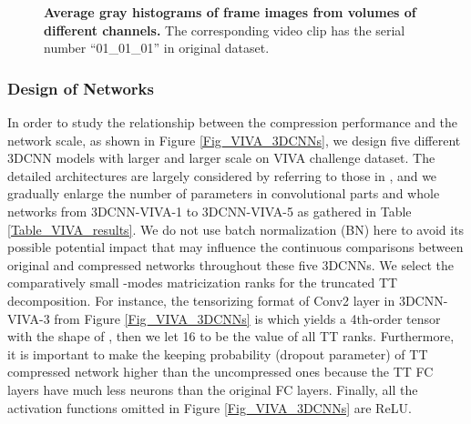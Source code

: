 \documentclass[a4paper,fleqn]{cas-dc}
\begin{document}
\begin{figure}
\centering
{}
\caption{\textbf{Average gray histograms of frame images from volumes of different channels.} The corresponding video clip has the serial number ``01\_01\_01'' in original dataset.}
\label{Fig_hists}
\end{figure}

\subsubsection{Design of Networks}\quad

\begin{figure*}
\centering
{}
\caption{\textbf{Larger and larger network architectures for VIVA challenge dataset.} The numbers in red bold formats denote the modes of channels  or  in  which represents the 3D convolutional kernel. Note that the number of neurons in every ``Linear1'' layer is equal to the number of output elements of corresponding last convolutional layer.}
\label{Fig_VIVA_3DCNNs}
\end{figure*}

In order to study the relationship between the compression performance and the network scale, as shown in Figure \ref{Fig_VIVA_3DCNNs}, we design five different 3DCNN models with larger and larger scale on VIVA challenge dataset. The detailed architectures are largely considered by referring to those in \citet{Molchanov_2015_3DCNN_1}, and we gradually enlarge the number of parameters in convolutional parts and whole networks from 3DCNN-VIVA-1 to 3DCNN-VIVA-5 as gathered in Table \ref{Table_VIVA_results}. We do not use batch normalization (BN) here to avoid its possible potential impact that may influence the continuous comparisons between original and compressed networks throughout these five 3DCNNs. We select the comparatively small -modes matricization ranks for the truncated TT decomposition. For instance, the tensorizing format of Conv2 layer in 3DCNN-VIVA-3 from Figure \ref{Fig_VIVA_3DCNNs} is  which yields a 4th-order tensor with the shape of , then we let 16 to be the value of all TT ranks. Furthermore, it is important to make the keeping probability (dropout parameter) of TT compressed network higher than the uncompressed ones because the TT FC layers have much less neurons than the original FC layers. Finally, all the activation functions omitted in Figure \ref{Fig_VIVA_3DCNNs} are ReLU.
\end{document}
